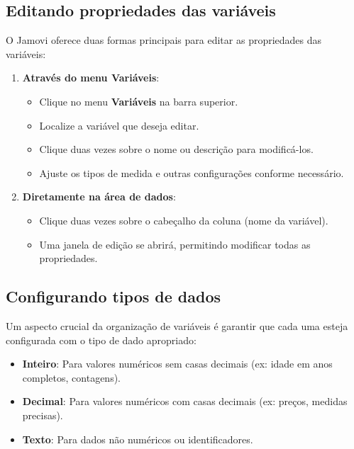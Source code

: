 \subsection{Editando propriedades das variáveis}

O Jamovi oferece duas formas principais para editar as propriedades das variáveis:

\begin{enumerate}
    \item \textbf{Através do menu Variáveis}:
    \begin{itemize}
        \item Clique no menu \textbf{Variáveis} na barra superior.
        \item Localize a variável que deseja editar.
        \item Clique duas vezes sobre o nome ou descrição para modificá-los.
        \item Ajuste os tipos de medida e outras configurações conforme necessário.
    \end{itemize}
    
    \item \textbf{Diretamente na área de dados}:
    \begin{itemize}
        \item Clique duas vezes sobre o cabeçalho da coluna (nome da variável).
        \item Uma janela de edição se abrirá, permitindo modificar todas as propriedades.
    \end{itemize}
\end{enumerate}


\subsection{Configurando tipos de dados}

Um aspecto crucial da organização de variáveis é garantir que cada uma esteja configurada com o tipo de dado apropriado:

\begin{itemize}
    \item \textbf{Inteiro}: Para valores numéricos sem casas decimais (ex: idade em anos completos, contagens).
    \item \textbf{Decimal}: Para valores numéricos com casas decimais (ex: preços, medidas precisas).
    \item \textbf{Texto}: Para dados não numéricos ou identificadores.
\end{itemize}

